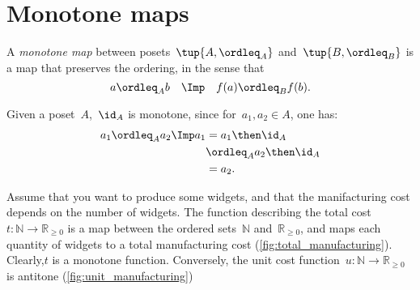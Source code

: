 \section{Monotone maps}

\begin{definition}
A \emph{monotone map} between posets~$\tup{A, \ordleq_A}$ and~$\tup{B, \ordleq_B}$ is a map that preserves the ordering, in the sense that
\begin{equation}
 a \ordleq_A b \quad \Imp \quad f(a) \ordleq_B f(b).
\end{equation}

\begin{comment}\noindent A monotone map is an \emph{isomorphism} if the other direction
of the implication holds as well:
\begin{equation}
 a \leq_A b \quad \Leftrightarrow \quad f(a) \leq_B f(b).
\end{equation}
\end{comment}
\end{definition}
\begin{remark}
Given a poset~$A$,~$\id_A$ is monotone, since for~$a_1,a_2\in A$, one has:
\begin{equation}
\begin{aligned}
a_1\ordleq_A a_2 \Imp a_1&=a_1\then \id_A\\
&\ordleq_A a_2\then \id_A \\
&= a_2.
\end{aligned}
\end{equation}
\end{remark}

\begin{example}
Assume that you want to produce some widgets, and that the manifacturing cost depends on the number of widgets. The function describing the total cost~$t\colon \mathbb{N}\to \mathbb{R}_{\geq 0}$ is a map between the ordered sets~$\mathbb{N}$ and~$\mathbb{R}_{\geq 0}$, and maps each quantity of widgets to a total manufacturing cost (\cref{fig:total_manufacturing}). Clearly,$t$ is a monotone function. Conversely, the unit cost function~$u\colon \mathbb{N}\to \mathbb{R}_{\geq 0}$ is antitone (\cref{fig:unit_manufacturing})
\end{example}

\begin{example}
\end{example}

